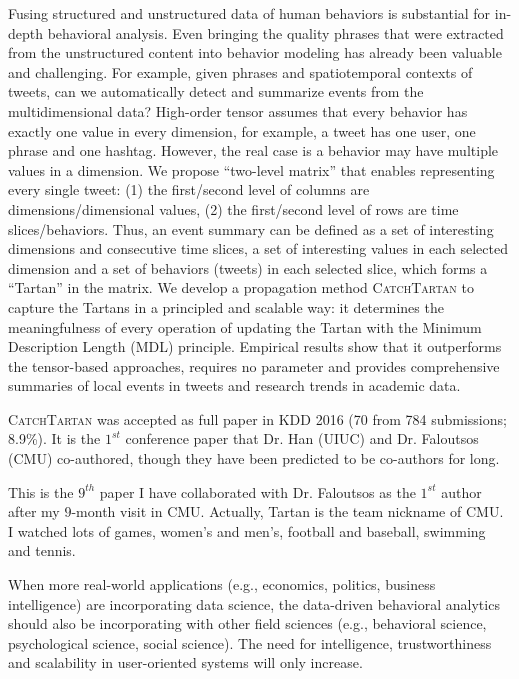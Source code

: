 \documentclass[10.5pt]{article}
\begin{document}
Fusing structured and unstructured data of human behaviors is substantial for in-depth behavioral analysis. Even bringing the quality phrases that were extracted from the unstructured content into behavior modeling has already been valuable and challenging. For example, given phrases and spatiotemporal contexts of tweets, can we automatically detect and summarize events from the multidimensional data? High-order tensor assumes that every behavior has exactly one value in every dimension, for example, a tweet has one user, one phrase and one hashtag. However, the real case is a behavior may have multiple values in a dimension. We propose ``two-level matrix'' that enables representing every single tweet: (1) the first/second level of columns are dimensions/dimensional values, (2) the first/second level of rows are time slices/behaviors. Thus, an event summary can be defined as a set of interesting dimensions and consecutive time slices, a set of interesting values in each selected dimension and a set of behaviors (tweets) in each selected slice, which forms a ``Tartan'' in the matrix. We develop a propagation method \textsc{CatchTartan} \cite{jiang2016catchtartan} to capture the Tartans in a principled and scalable way: it determines the meaningfulness of every operation of updating the Tartan with the Minimum Description Length (MDL) principle. Empirical results show that it outperforms the tensor-based approaches, requires no parameter and provides comprehensive summaries of local events in tweets and research trends in academic data.

\begin{compactitem}
\item \textsc{CatchTartan} \cite{jiang2016catchtartan} was accepted as full paper in KDD 2016 (70 from 784 submissions; 8.9\%). It is the $1^{st}$ conference paper that Dr. Han (UIUC) and Dr. Faloutsos (CMU) co-authored, though they have been predicted to be co-authors for long.
\item This is the \underline{$9^{th}$} paper I have collaborated with Dr. Faloutsos as the $1^{st}$ author after my \underline{$9$}-month visit in CMU. Actually, Tartan is the team nickname of CMU. I watched lots of games, women's and men's, football and baseball, swimming and tennis.
\end{compactitem}

\vskip 0.15in
\vskip 0.01in

When more real-world applications (e.g., economics, politics, business intelligence) are incorporating data science, the data-driven behavioral analytics should also be incorporating with other field sciences (e.g., behavioral science, psychological science, social science). The need for intelligence, trustworthiness and scalability in user-oriented systems will only increase.
\end{document}
